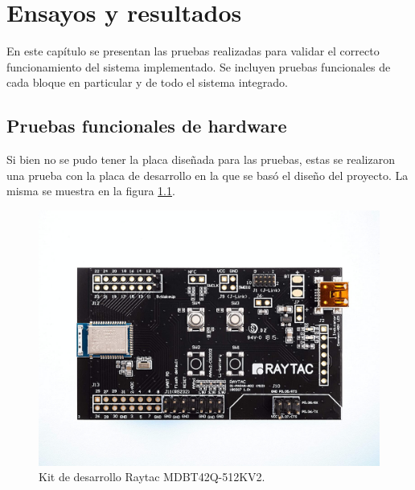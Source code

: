 
\chapter{Ensayos y resultados} %

\label{Chapter4} %

En este capítulo se presentan las pruebas realizadas para validar el correcto funcionamiento del sistema implementado. Se incluyen pruebas funcionales de cada bloque en particular y de todo el sistema integrado.


\section{Pruebas funcionales de hardware}
\label{sec:pruebasHW}

Si bien no se pudo tener la placa diseñada para las pruebas, estas se realizaron una prueba con la placa de desarrollo en la que se basó el diseño del proyecto. La misma se muestra en la figura \ref{fig:KDRaytac}.

\begin{figure}[htpb]
	\centering
	\includegraphics[scale=0.15]{./Figures/DKMDBT42Q-512KV2.jpg}
	\caption{Kit de desarrollo Raytac MDBT42Q-512KV2.}
	\label{fig:KDRaytac}
\end{figure}

